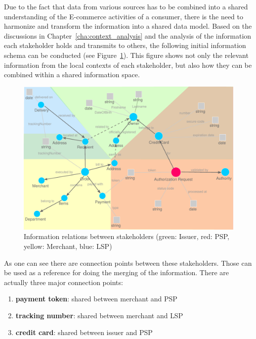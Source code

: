 Due to the fact that data from various sources has to be combined into a shared understanding of the E-commerce activities of a consumer, there is the need to harmonize and transform the information into a shared data model. Based on the discussions in Chapter~\ref{cha:context_analysis} and the analysis of the information each stakeholder holds and transmits to others, the following initial information schema can be conducted (see Figure~\ref{fig:images_data_model}). This figure shows not only the relevant information from the local contexts of each stakeholder, but also how they can be combined within a shared information space. \\

\begin{figure}[!ht]
  \centering
  \includegraphics[width=0.9\columnwidth]{images/ontology_scenario_1.pdf}
  \caption{Information relations between stakeholders (green: Issuer, red: \gls{PSP}, yellow: Merchant, blue: \gls{LSP})}
\label{fig:images_data_model}
\end{figure}

As one can see there are connection points between these stakeholders. Those can be used as a reference for doing the merging of the information. There are actually three major connection points: \@

\begin{enumerate}
  \item \textbf{payment token}: shared between merchant and \gls{PSP}
  \item \textbf{tracking number}: shared between merchant and \gls{LSP}
  \item \textbf{credit card}: shared between issuer and \gls{PSP}
\end{enumerate}

